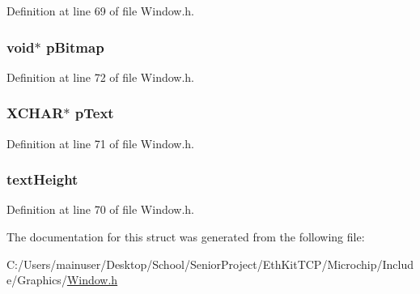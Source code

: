 Definition at line 69 of file Window.\+h.

\hypertarget{struct_w_i_n_d_o_w_aef9bed8e1a29e17226ccbd9a3d81f9e1}{}
\subsubsection[{p\+Bitmap}]{\setlength{\rightskip}{0pt plus 5cm}void$\ast$ p\+Bitmap}\label{struct_w_i_n_d_o_w_aef9bed8e1a29e17226ccbd9a3d81f9e1}


Definition at line 72 of file Window.\+h.

\hypertarget{struct_w_i_n_d_o_w_a934b5563cdaf14803728ff3a7b7e8c7f}{}
\subsubsection[{p\+Text}]{\setlength{\rightskip}{0pt plus 5cm}X\+C\+H\+A\+R$\ast$ p\+Text}\label{struct_w_i_n_d_o_w_a934b5563cdaf14803728ff3a7b7e8c7f}


Definition at line 71 of file Window.\+h.

\hypertarget{struct_w_i_n_d_o_w_a40fa9c35391b0005032180b85e7afd34}{}
\subsubsection[{text\+Height}]{ text\+Height}\label{struct_w_i_n_d_o_w_a40fa9c35391b0005032180b85e7afd34}


Definition at line 70 of file Window.\+h.



The documentation for this struct was generated from the following file\+:\begin{DoxyCompactItemize}
\item 
C\+:/\+Users/mainuser/\+Desktop/\+School/\+Senior\+Project/\+Eth\+Kit\+T\+C\+P/\+Microchip/\+Include/\+Graphics/\hyperlink{_window_8h}{Window.\+h}\end{DoxyCompactItemize}
